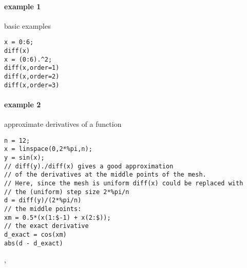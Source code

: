 \begin{examples}
\paragraph{example 1} basic examples
\begin{Verbatim}
x = 0:6;
diff(x)
x = (0:6).^2;
diff(x,order=1)
diff(x,order=2)
diff(x,order=3)
\end{Verbatim}

\paragraph{example 2} approximate derivatives of a function
\begin{Verbatim}
n = 12;
x = linspace(0,2*%pi,n);
y = sin(x);
// diff(y)./diff(x) gives a good approximation
// of the derivatives at the middle points of the mesh.
// Here, since the mesh is uniform diff(x) could be replaced with
// the (uniform) step size 2*%pi/n
d = diff(y)/(2*%pi/n)
// the middle points:
xm = 0.5*(x(1:$-1) + x(2:$));
// the exact derivative
d_exact = cos(xm)
abs(d - d_exact)
\end{Verbatim}
\end{examples}

\begin{manseealso}
  , 
\end{manseealso}

